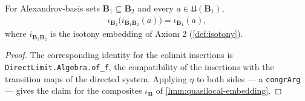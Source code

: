 \begin{lemma}
    \label{lmm:quasilocal-embedding-cocone}
    \leanok
    For Alexandrov-basis sets $\mathbf{B}_1 \subseteq \mathbf{B}_2$ and every $a \in \mathfrak{U}(\mathbf{B}_1)$,
    \begin{align}
        \iota_{\mathbf{B}_2}\bigl(i_{\mathbf{B}_1\mathbf{B}_2}(a)\bigr) = \iota_{\mathbf{B}_1}(a),
    \end{align}
    where $i_{\mathbf{B}_1\mathbf{B}_2}$ is the isotony embedding of Axiom 2 (\ref{def:isotony}).
\end{lemma}
\begin{proof}
    \leanok
    The corresponding identity for the colimit insertions is \texttt{DirectLimit.Algebra.of\_f}, the compatibility of the insertions with the transition maps of the directed system. Applying $\eta$ to both sides --- a \texttt{congrArg} --- gives the claim for the composites $\iota_{\mathbf{B}}$ of \ref{lmm:quasilocal-embedding}.
\end{proof}

